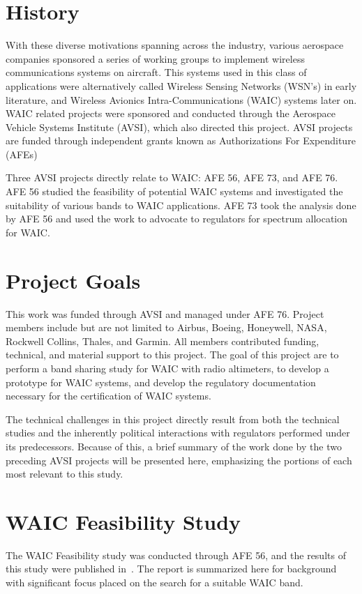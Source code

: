 \section{History} 

With these diverse motivations spanning across the industry, various aerospace companies sponsored a series of working groups to implement wireless communications systems on aircraft. This systems used in this class of applications were alternatively called Wireless Sensing Networks (WSN's) in early literature, and Wireless Avionics Intra-Communications (WAIC) systems later on. WAIC related projects were sponsored and conducted through the Aerospace Vehicle Systems Institute (AVSI), which also directed this project. AVSI projects are funded through independent grants known as Authorizations For Expenditure (AFEs)

Three AVSI projects directly relate to WAIC: AFE 56, AFE 73, and AFE 76. AFE 56 studied the feasibility of potential WAIC systems  and investigated the suitability of various bands to WAIC applications. AFE 73 took the analysis done by AFE 56 and used the work to advocate to regulators for spectrum allocation for WAIC. 

\section{Project Goals}
This work was funded through AVSI and managed under AFE 76. Project members include but are not limited to Airbus, Boeing, Honeywell, NASA, Rockwell Collins, Thales, and Garmin. All members contributed funding, technical, and material support to this project. The goal of this project are to perform a band sharing study for WAIC with radio altimeters, to develop a prototype for WAIC systems, and develop the regulatory documentation necessary for the certification of WAIC systems. 

The technical challenges in this project directly result from both the technical studies and the inherently political interactions with regulators performed under its predecessors. Because of this, a brief summary of the work done by the two preceding AVSI projects will be presented here, emphasizing the portions of each most relevant to this study. 

\section{WAIC Feasibility Study}
The WAIC Feasibility study was conducted through AFE 56, and the results of this study were published in~\cite{ferrell_feasibility_2007}. The report is summarized here for background with significant focus placed on the search for a suitable WAIC band. 

